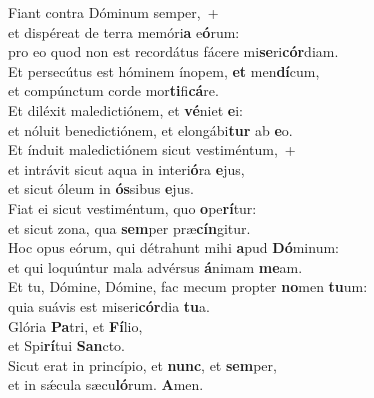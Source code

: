 \evenverse Fiant contra Dóminum semper,~+\\\evenverse  et dispéreat de terra memóri\textbf{a} e\textbf{ó}rum:~\*\\
\evenverse pro eo quod non est recordátus fácere mi\textbf{se}ri\textbf{cór}diam.\\
\oddverse Et persecútus est hóminem ínopem, \textbf{et} men\textbf{dí}cum,~\*\\
\oddverse et compúnctum corde mor\textbf{ti}fi\textbf{cá}re.\\
\evenverse Et diléxit maledictiónem, et \textbf{vé}niet \textbf{e}i:~\*\\
\evenverse et nóluit benedictiónem, et elongábi\textbf{tur} ab \textbf{e}o.\\
\oddverse Et índuit maledictiónem sicut vestiméntum,~+\\
\oddverse  et intrávit sicut aqua in interi\textbf{ó}ra \textbf{e}jus,~\*\\
\oddverse et sicut óleum in \textbf{ós}sibus \textbf{e}jus.\\
\evenverse Fiat ei sicut vestiméntum, quo \textbf{o}pe\textbf{rí}tur:~\*\\
\evenverse et sicut zona, qua \textbf{sem}per præ\textbf{cín}gitur.\\
\oddverse Hoc opus eórum, qui détrahunt mihi \textbf{a}pud \textbf{Dó}minum:~\*\\
\oddverse et qui loquúntur mala advérsus \textbf{á}nimam \textbf{me}am.\\
\evenverse Et tu, Dómine, Dómine, fac mecum propter \textbf{no}men \textbf{tu}um:~\*\\
\evenverse quia suávis est miseri\textbf{cór}dia \textbf{tu}a.\\
\oddverse Glória \textbf{Pa}tri, et \textbf{Fí}lio,~\*\\
\oddverse et Spi\textbf{rí}tui \textbf{San}cto.\\
\evenverse Sicut erat in princípio, et \textbf{nunc}, et \textbf{sem}per,~\*\\
\evenverse et in sǽcula sæcu\textbf{ló}rum. \textbf{A}men.\\
